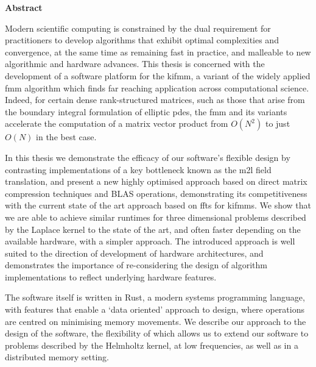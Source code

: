\thispagestyle{plain}

\begin{center}
    \textbf{Abstract}
\end{center}

Modern scientific computing is constrained by the dual requirement for practitioners to develop algorithms that exhibit optimal complexities and convergence, at the same time as remaining fast in practice, and malleable to new algorithmic and hardware advances. This thesis is concerned with the development of a software platform for the \acrfull{kifmm}, a variant of the widely applied \acrfull{fmm} algorithm which finds far reaching application across computational science. Indeed, for certain dense rank-structured matrices, such as those that arise from the boundary integral formulation of elliptic \acrfull{pdes}, the \acrshort{fmm} and its variants accelerate the computation of a matrix vector product from $O(N^2)$ to just $O(N)$ in the best case.

In this thesis we demonstrate the efficacy of our software's flexible design by contrasting implementations of a key bottleneck known as the \acrfull{m2l} field translation, and present a new highly optimised approach based on direct matrix compression techniques and BLAS operations, demonstrating its competitiveness with the current state of the art approach based on \acrfull{ffts} for \acrshort{kifmm}s. We show that we are able to achieve similar runtimes for three dimensional problems described by the Laplace kernel to the state of the art, and often faster depending on the available hardware, with a simpler approach. The introduced approach is well suited to the direction of development of hardware architectures, and demonstrates the importance of re-considering the design of algorithm implementations to reflect underlying hardware features.

The software itself is written in Rust, a modern systems programming language, with features that enable a `data oriented’ approach to design, where operations are centred on minimising memory movements. We describe our approach to the design of the software, the flexibility of which allows us to extend our software to problems described by the Helmholtz kernel, at low frequencies, as well as in a distributed memory setting.

